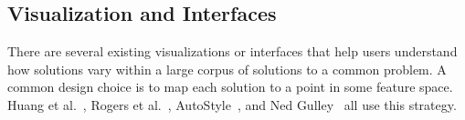 \begin{comment}
There is a particularly rich literature on Bayesian mixture models. The following methods are particularly relevant to modeling code as mixtures of choices:
\begin{itemize}
\item Latent Dirichlet Allocation (LDA)~\cite{bleiLDA} is a mixture model that is typically applied to natural language. In that context, it learns topics, i.e., distributions over words, as well as the distributions over topics found in each document. %
\item Correlated Topic Models (CTM)~\cite{} are like LDA but topics are no longer assumed to be independent. In other words, the topics learned by the model can be correlated. If it is possible to formulate the inputs such that the learned latent topics represent design decisions, this could capture the reality that design choices are not independent of each other in code composition.
\item Hierarchical Dirichlet Process (HDP) model~\cite{}, like DPMMs, do not require a pre-set number of clusters. Unlike DPMMs, solutions do not belong to a single cluster. Like LDA, solutions contain features, and each feature belongs to a cluster. Solutions can contain features from multiple clusters. This method emulates LDA with no pre-set number of clusters. 
\item Models and inference algorithms built on the Indian Buffet Process (IBP), such as those by \cite{doshi2009indian}, are like HDP but individual features can belong to multiple clusters.
\end{itemize}

\todo{get CTM and HDP citations}
\end{comment}

\subsection{Visualization and Interfaces}

There are several existing visualizations or interfaces that help users understand how solutions vary within a large corpus of solutions to a common problem. A common design choice is to map each solution to a point in some feature space. Huang et al.~\cite{MOOCshop}, Rogers et al.~\cite{ACESthesis}, AutoStyle~\cite{choudhury2016autostyle}, and Ned Gulley~\cite{ICERGlassman} all use this strategy. %

